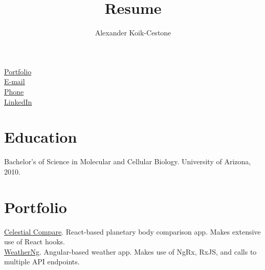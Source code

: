 \documentclass{article}
\author{Alexander Koik-Cestone}
\title{Resume}
\begin{document}
\maketitle
\begin{center}
\href{https://sirkoik.github.io#portfolio}{Portfolio} \\
\href{mailto:akoikcestone@gmail.com}{E-mail} \\
\href{tel:614-674-0668}{Phone} \\
\href{https://www.linkedin.com/in/alexander-koik-cestone-89304556/}{LinkedIn}
\end{center}

\section{Education}
Bachelor's of Science in Molecular and Cellular Biology. University of Arizona, 2010.

\section{Portfolio}

\href{https://sirkoik.github.io/Celestial-Compare}{Celestial Compare}. React-based planetary body comparison app. Makes extensive use of React hooks. \\
\href{https://sirkoik.github.io/WeatherNg}{WeatherNg}. Angular-based weather app. Makes use of NgRx, RxJS, and calls to multiple API endpoints.
\end{document}

